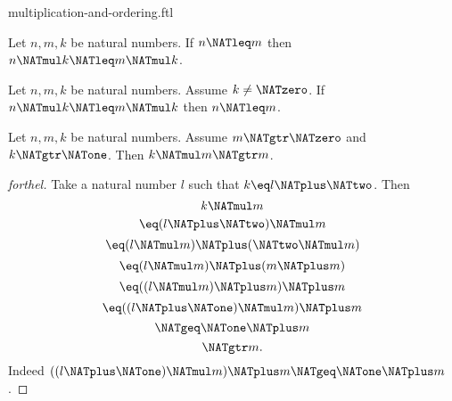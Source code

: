 \documentclass{naproche-library}
\begin{document}
\begin{smodule}[title=Multiplication and Ordering]{multiplication-and-ordering.ftl}
\begin{corollary}[forthel,id=ARITHMETIC_06_8946886668976128]
  Let $n, m, k$ be natural numbers.
  If $n \NATleq m$ then $n \NATmul k \NATleq m \NATmul k$.
\end{corollary}

\begin{corollary}[forthel,id=ARITHMETIC_06_4374428949413888]
  Let $n, m, k$ be natural numbers.
  Assume $k \neq \NATzero$.
  If $n \NATmul k \NATleq m \NATmul k$ then $n \NATleq m$.
\end{corollary}

\begin{proposition}[forthel,id=ARITHMETIC_06_8813409145454592]
  Let $n, m, k$ be natural numbers.
  Assume $m \NATgtr \NATzero$ and $k \NATgtr \NATone$.
  Then $k \NATmul m \NATgtr m$.
\end{proposition}
\begin{proof}[forthel]
  Take a natural number $l$ such that $k \eq l \NATplus \NATtwo$.
  Then
  \[  k \NATmul m                       \]
  \[    \eq (l \NATplus \NATtwo) \NATmul m             \]
  \[    \eq (l \NATmul m) \NATplus (\NATtwo \NATmul m)   \]
  \[    \eq (l \NATmul m) \NATplus (m \NATplus m)       \]
  \[    \eq ((l \NATmul m) \NATplus m) \NATplus m       \]
  \[    \eq ((l \NATplus \NATone) \NATmul m) \NATplus m       \]
  \[    \NATgeq \NATone \NATplus m                    \]
  \[    \NATgtr m.                          \]
  Indeed $((l \NATplus \NATone) \NATmul m) \NATplus m \NATgeq \NATone \NATplus m$.
\end{proof}
\end{smodule}
\end{document}
